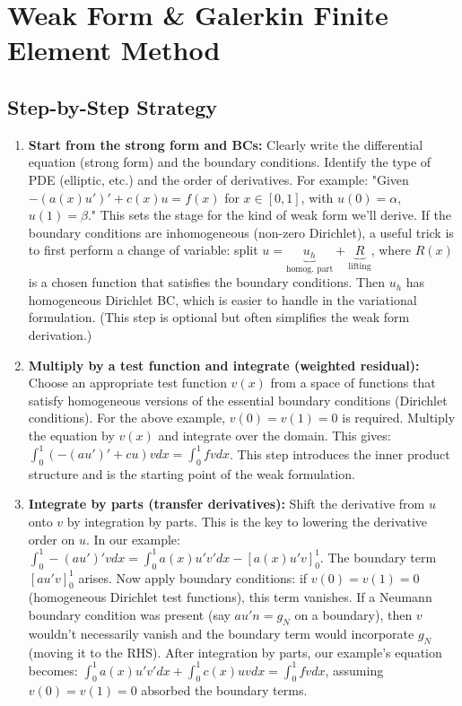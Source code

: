 \documentclass[a4paper,11pt]{article}
\begin{document}
\section{Weak Form \& Galerkin Finite Element Method}

\subsection{Step-by-Step Strategy}

\begin{enumerate}
    \item \textbf{Start from the strong form and BCs:} Clearly write the differential equation (strong form) and the boundary conditions. Identify the type of PDE (elliptic, etc.) and the order of derivatives. For example: "Given $- (a(x) u')' + c(x) u = f(x)$ for $x\in [0,1]$, with $u(0)=\alpha$, $u(1)=\beta$." This sets the stage for the kind of weak form we'll derive. If the boundary conditions are inhomogeneous (non-zero Dirichlet), a useful trick is to first perform a change of variable: split $u = \underbrace{u_h}_{\text{homog. part}} + \underbrace{R}_{\text{lifting}}$, where $R(x)$ is a chosen function that satisfies the boundary conditions. Then $u_h$ has homogeneous Dirichlet BC, which is easier to handle in the variational formulation. (This step is optional but often simplifies the weak form derivation.)

    \item \textbf{Multiply by a test function and integrate (weighted residual):} Choose an appropriate test function $v(x)$ from a space of functions that satisfy homogeneous versions of the essential boundary conditions (Dirichlet conditions). For the above example, $v(0)=v(1)=0$ is required. Multiply the equation by $v(x)$ and integrate over the domain. This gives: $\int_0^1 (-(au')' + cu) v dx = \int_0^1 f v dx$. This step introduces the inner product structure and is the starting point of the weak formulation.

    \item \textbf{Integrate by parts (transfer derivatives):} Shift the derivative from $u$ onto $v$ by integration by parts. This is the key to lowering the derivative order on $u$. In our example: $\int_0^1 -(au')' v dx = \int_0^1 a(x)u' v' dx - [a(x)u' v]_0^1$. The boundary term $[a u' v]_{0}^{1}$ arises. Now apply boundary conditions: if $v(0)=v(1)=0$ (homogeneous Dirichlet test functions), this term vanishes. If a Neumann boundary condition was present (say $a u' n = g_N$ on a boundary), then $v$ wouldn't necessarily vanish and the boundary term would incorporate $g_N$ (moving it to the RHS). After integration by parts, our example's equation becomes: $\int_0^1 a(x)u' v' dx + \int_0^1 c(x)u v dx = \int_0^1 f v dx$, assuming $v(0)=v(1)=0$ absorbed the boundary terms.


\end{enumerate}
\end{document}
